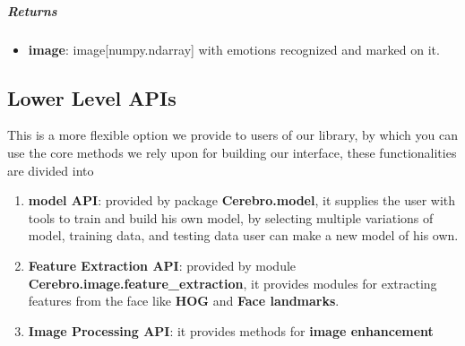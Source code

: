 \subparagraph{Returns}
\begin{changemargin}{0.5cm}{0cm}
\begin{itemize}[noitemsep,nolistsep]
	\item \textbf{image}: image[numpy.ndarray] with emotions recognized and marked on it.
\end{itemize}
\end{changemargin}

\begin{comment}
\subparagraph{Usage:}
\begin{changemargin}{0.5cm}{0cm}
\begin{itemize}
	\item import the module:
	\begin{lstlisting}[language=Python]
	from interface Import process_image as pi\end{lstlisting}
	
	\item call it:
	\begin{lstlisting}[language=Python]
	pi.mark_faces_emotions(image)\end{lstlisting}
\end{itemize}
\end{changemargin}
\end{comment}

\newpage

\subsection{Lower Level APIs}
This is a more flexible option we provide to users of our library, by which you can use the core methods we rely upon for building our interface, these functionalities are divided into
\begin{enumerate}
	\item \textbf{model API}: provided by package \textbf{Cerebro.model}, it supplies the user with tools to train and build his own model, by selecting multiple variations of model, training data, and testing data user can make a new model of his own. 
	\item \textbf{Feature Extraction API}: provided by module \textbf{Cerebro.image.feature\_extraction}, it provides modules for extracting features from the face like \textbf{HOG} and \textbf{Face landmarks}.
	\item \textbf{Image Processing API}: it provides methods for \textbf{image enhancement}
\end{enumerate}

